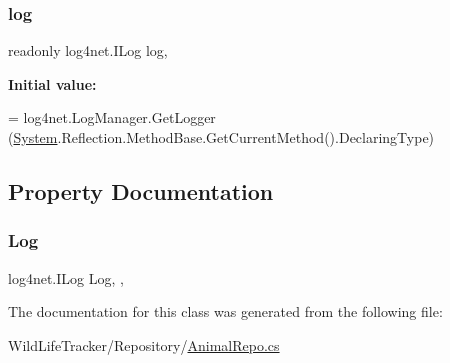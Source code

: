 \subsubsection{\texorpdfstring{log}{log}}
{\footnotesize\ttfamily readonly log4net.\+I\+Log log\hspace{0.3cm}{\ttfamily [static]}, {\ttfamily [private]}}

{\bfseries Initial value\+:}
\begin{DoxyCode}
= log4net.LogManager.GetLogger
       (\hyperlink{namespaceSystem}{System}.Reflection.MethodBase.GetCurrentMethod().DeclaringType)
\end{DoxyCode}


\subsection{Property Documentation}
\mbox{\label{classWildLifeTracker_1_1Repository_1_1AnimalRepo_a5fc9abb86e6110ecd61d0a1a7d740a8a}} 
\subsubsection{\texorpdfstring{Log}{Log}}
{\footnotesize\ttfamily log4net.\+I\+Log Log\hspace{0.3cm}{\ttfamily [static]}, {\ttfamily [get]}, {}}



The documentation for this class was generated from the following file\+:\begin{DoxyCompactItemize}
\item 
Wild\+Life\+Tracker/\+Repository/\hyperlink{AnimalRepo_8cs}{Animal\+Repo.\+cs}\end{DoxyCompactItemize}
